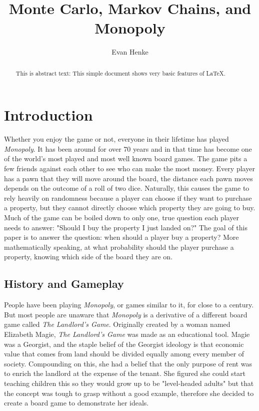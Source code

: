 \documentclass{article}
\begin{document}
\title{Monte Carlo, Markov Chains, and Monopoly}
\author{Evan Henke}

\maketitle

\begin{abstract}
This is abstract text: This simple document shows very basic features of
\LaTeX{}.
\end{abstract}


\section{Introduction}

Whether you enjoy the game or not, everyone in their lifetime has played  \textit{Monopoly}.  It has been around for over 70 years and in that time has become one of the world’s most played and most well known board games.  The game pits a few friends against each other to see who can make the most money.  Every player has a pawn that they will move around the board, the distance each pawn moves depends on the outcome of a roll of two dice.  Naturally, this causes the game to rely heavily on randomness because a player can choose if they want to purchase a property, but they cannot directly choose which property they are going to buy.  Much of the game can be boiled down to only one, true question each player needs to answer: "Should I buy the property I just landed on?"  The goal of this paper is to answer the question: when should a player buy a property?  More mathematically speaking, at what probability should the player purchase a property, knowing which side of the board they are on.

\subsection{History and Gameplay}

People have been playing \textit{Monopoly}, or games similar to it, for close to a century.  But most people are unaware that \textit{Monopoly} is a derivative of a different board game called \textit{The Landlord’s Game}.  Originally created by a woman named Elizabeth Magie, \textit{The Landlord’s Game} was made as an educational tool.  Magie was a Georgist, and the staple belief of the Georgist ideology is that economic value that comes from land should be divided equally among every member of society.  Compounding on this, she had a belief that the only purpose of rent was to enrich the landlord at the expense of the tenant.  She figured she could start teaching children this so they would grow up to be "level-headed adults" but that the concept was tough to grasp without a good example, therefore she decided to create a board game to demonstrate her ideals. 
\end{document}
